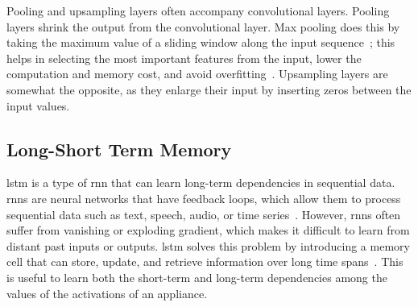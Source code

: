\newpage

Pooling and upsampling layers often accompany convolutional layers. Pooling layers shrink the output from the convolutional layer. Max pooling does this by taking the maximum value of a sliding window along the input sequence~\parencite{ahmad_deep_2019}; this helps in selecting the most important features from the input, lower the computation and memory cost, and avoid overfitting~\parencite{zhang_dive_2023,masci_stacked_2011}. Upsampling layers are somewhat the opposite, as they enlarge their input by inserting zeros between the input values.

\subsection{Long-Short Term Memory}

\acrfull{lstm} is a type of \acrfull{rnn} that can learn long-term dependencies in sequential data. \acrshort{rnn}s are neural networks that have feedback loops, which allow them to process sequential data such as text, speech, audio, or time series~\parencite{ahmad_deep_2019}. However, \acrshort{rnn}s often suffer from vanishing or exploding gradient, which makes it difficult to learn from distant past inputs or outputs. \acrshort{lstm} solves this problem by introducing a memory cell that can store, update, and retrieve information over long time spans~\parencite{hochreiter_long_1997}. This is useful to learn both the short-term and long-term dependencies among the values of the activations of an appliance.

